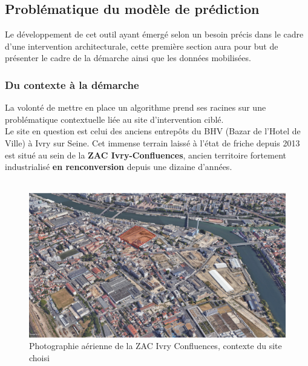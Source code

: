 \documentclass[
  11pt,
  french,
]{article}
\begin{document}
\newpage

\hypertarget{probluxe9matique-du-moduxe8le-de-pruxe9diction}{%
\subsection{Problématique du modèle de
prédiction}\label{probluxe9matique-du-moduxe8le-de-pruxe9diction}}

Le développement de cet outil ayant émergé selon un besoin précis dans
le cadre d'une intervention architecturale, cette première section aura
pour but de présenter le cadre de la démarche ainsi que les données
mobilisées.

\hypertarget{du-contexte-uxe0-la-duxe9marche}{%
\subsubsection{Du contexte à la
démarche}\label{du-contexte-uxe0-la-duxe9marche}}

La volonté de mettre en place un algorithme prend ses racines sur une
problématique contextuelle liée au site d'intervention ciblé.\\
Le site en question est celui des anciens entrepôts du BHV (Bazar de
l'Hotel de Ville) à Ivry sur Seine. Cet immense terrain laissé à l'état
de friche depuis 2013 est situé au sein de la \textbf{ZAC
Ivry-Confluences}, ancien territoire fortement industrialisé \textbf{en
renconversion} depuis une dizaine d'années.\\
~\\

\begin{tcolorbox}
\begin{figure}

{\centering \includegraphics[width=0.9\linewidth]{__imgs/zac_photo} 

}

\caption[Photographie aérienne de la ZAC Ivry Confluences, contexte du site choisi  -  Google Earth]{Photographie aérienne de la ZAC Ivry Confluences, contexte du site choisi}\label{fig:zac_photo}
\end{figure}
\end{tcolorbox}
\end{document}

